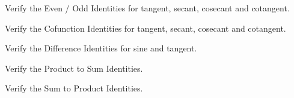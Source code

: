 \documentclass{ximera}
\begin{document}
\begin{problem}
Verify the Even / Odd Identities for tangent, secant, cosecant and cotangent.
\end{problem}
 
\begin{problem}
Verify the Cofunction Identities for tangent, secant, cosecant and cotangent.
\end{problem}

\begin{problem}
Verify the Difference Identities for sine and tangent.
\end{problem}

\begin{problem}
Verify the Product to Sum Identities.
\end{problem}

\begin{problem}
Verify the Sum to Product Identities.
\end{problem}
\end{document}
